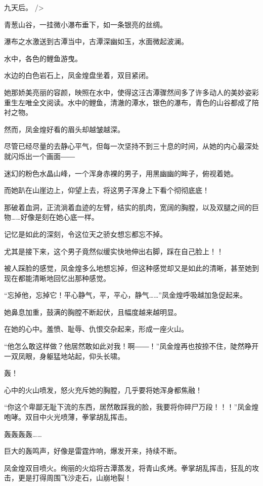 
\begin{this_body}

九天后。 />

青葱山谷，一挂微小瀑布垂下，如一条银亮的丝绸。

瀑布之水激送到古潭当中，古潭深幽如玉，水面微起波澜。

水中，各色的鲤鱼游曳。

水边的白色岩石上，凤金煌盘坐着，双目紧闭。

她那娇美亮丽的容颜，映照在水中，使得这汪古潭骤然间多了许多动人的美妙姿彩重生左唯全文阅读。水中的鲤鱼，清澈的潭水，银色的瀑布，青色的山谷都成了陪衬之物。

然而，凤金煌好看的眉头却越皱越深。

尽管已经尽量的去静心平气，但每一次坚持不到三十息的时间，从她的内心最深处就闪烁出一个画面――

迷幻的粉色水晶山峰，一个浑身赤裸的男子，用黑幽幽的眸子，俯视着她。

而她趴在山崖边上，仰望上去，将这男子浑身上下看个彻彻底底！

那破着血洞，正流淌着血迹的左臂，结实的肌肉，宽阔的胸膛，以及双腿之间的巨物……好像是刻在她心底一样。

记忆是如此的深刻，令这位天之骄女想忘都忘不掉。

尤其是接下来，这个男子竟然似缓实快地伸出右脚，踩在自己脸上！！

被人踩脸的感觉，凤金煌多么地想忘掉，但这种感觉却又是如此的清晰，甚至她到现在都能清晰地回忆出那种感觉。

“忘掉他，忘掉它！平心静气，平，平心，静气……”凤金煌呼吸越加急促起来。

她鼻息加重，鼓满的胸膛不断起伏，且幅度越来越明显。

在她的心中。羞愤、耻辱、仇恨交杂起来，形成一座火山。

“他怎么敢这样做？他居然敢如此对我！啊――！”凤金煌再也按捺不住，陡然睁开一双凤眼，身躯猛地站起，仰头长啸。

轰！

心中的火山喷发，怒火充斥她的胸膛，几乎要将她浑身都焦融！

“你这个卑鄙无耻下流的东西，居然敢踩我的脸，我要将你碎尸万段！！！”凤金煌咆哮。双目中火光喷薄，拳掌胡乱挥击。

轰轰轰轰……

巨大的轰鸣声，好像是雷霆炸响，爆发开来，持续不断。

凤金煌双目喷火。绚丽的火焰将古潭蒸发，将青山炙烤。拳掌胡乱挥击，狂乱的攻击，更是打得周围飞沙走石，山崩地裂！


\end{this_body}
